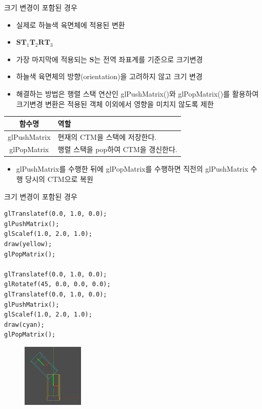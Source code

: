 \documentclass{beamer}
\begin{document}
\begin{frame}[fragile]{크기 변경이 포함된 경우}

\begin{itemize}
\item 실제로 하늘색 육면체에 적용된 변환
\item ${\mathbf S \mathbf T_1 \mathbf T_2 \mathbf R \mathbf T_3}$
\item 가장 마지막에 적용되는 ${\mathbf S}$는 전역 좌표계를 기준으로 크기변경
\item 하늘색 육면체의 방향(orientation)을 고려하지 않고 크기 변경
\item 해결하는 방법은 행렬 스택 연산인 {\sf glPushMatrix()}와 {\sf glPopMatrix()}를 활용하여 크기변경 변환은 적용된 객체 이외에서 영향을 미치지 않도록 제한
\end{itemize}

\begin{center}
\begin{tabular}{|c|p{7cm}|}\hline
{\small \sf 함수명} & {\small \sf 역할}\\ \hline
{\small \sf glPushMatrix} & {\small \sf 현재의 CTM을 스택에 저장한다.}\\ \hline
{\small \sf glPopMatrix} & {\small \sf 행렬 스택을 pop하여 CTM을 갱신한다.}\\ \hline
\end{tabular}
\end{center}

\begin{itemize}
\item {\sf glPushMatrix}를 수행한 뒤에 {\sf glPopMatrix}를 수행하면 직전의 {\sf glPushMatrix} 수행 당시의 CTM으로 복원
\end{itemize}

\end{frame}

\begin{frame}[fragile]{크기 변경이 포함된 경우}

\lstset{language=C++, escapechar=^} 
\begin{lstlisting}
glTranslatef(0.0, 1.0, 0.0);
glPushMatrix();
glScalef(1.0, 2.0, 1.0);
draw(yellow);
glPopMatrix();

glTranslatef(0.0, 1.0, 0.0);
glRotatef(45, 0.0, 0.0, 0.0);
glTranslatef(0.0, 1.0, 0.0);
glPushMatrix();
glScalef(1.0, 2.0, 1.0);
draw(cyan);
glPopMatrix();
\end{lstlisting}

\begin{figure}
    \includegraphics[height=3cm]{OGL_transform/noScale.png}
\end{figure}

\end{frame}
\end{document}
